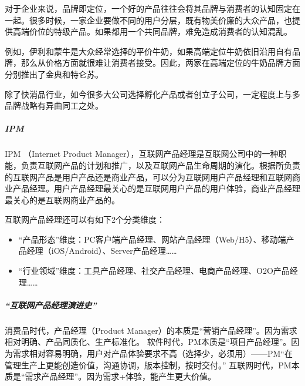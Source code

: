 \documentclass[letterpaper,11pt,english]{sphinxmanual}
\begin{document}
对于企业来说，品牌即定位，一个好的产品往往会将其品牌与消费者的认知固定在一起。很多时候，一家企业要做不同的用户分层，既有物美价廉的大众产品，也提供高端价位的特级产品。如果都用一个共同品牌，难免造成消费者的认知混乱。

例如，伊利和蒙牛是大众经常选择的平价牛奶，如果高端定位牛奶依旧沿用自有品牌，那么从价格方面就很难让消费者接受。因此，两家在高端定位的牛奶品牌方面分别推出了金典和特仑苏。

除了快消品行业，如今很多大公司选择孵化产品或者创立子公司，一定程度上与多品牌战略有异曲同工之处。


\subparagraph{IPM}
\label{\detokenize{chapter_introduction/AI_PM:ipm}}
IPM （Internet Product
Manager），互联网产品经理是互联网公司中的一种职能，负责互联网产品的计划和推广，以及互联网产品生命周期的演化。根据所负责的互联网产品是用户产品还是商业产品，可以分为互联网用户产品经理和互联网商业产品经理。用户产品经理最关心的是互联网用户产品的用户体验，商业产品经理最关心的是互联网商业产品的。

互联网产品经理还可以有如下2个分类维度：
\begin{itemize}
\item {} 
“产品形态”维度：PC客户端产品经理、网站产品经理（Web/H5）、移动端产品经理（iOS/Android）、Server产品经理……

\item {} 
“行业领域”维度：工具产品经理、社交产品经理、电商产品经理、O2O产品经理……

\end{itemize}


\subparagraph{“互联网产品经理演进史”}
\label{\detokenize{chapter_introduction/AI_PM:id2}}
消费品时代，产品经理（Product
Manager）的本质是“营销产品经理”。因为需求相对明确、产品同质化、生产标准化。
软件时代，PM本质是“项目产品经理”。因为需求相对容易明确，用户对产品体验要求不高（选择少，必须用）——PM“在管理生产上更能创造价值，沟通协调，版本控制，按时交付。”
互联网时代，PM本质是“需求产品经理”。因为需求+体验，能产生更大价值。
\end{document}
